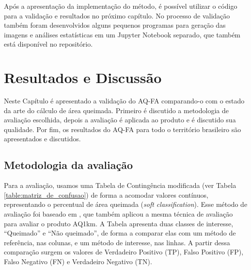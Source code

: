 \documentclass[cic,tc]{iiufrgs}
\begin{document}
\bigskip

Após a apresentação da implementação do método, é possível utilizar o código para a validação e resultados no próximo capítulo. No processo de validação também foram desenvolvidos alguns pequenos programas para geração das imagens e análises estatísticas em um Jupyter Notebook separado, que também está disponível no repositório. 



\chapter{Resultados e Discussão}
\label{chp:resultados_discussão}

Neste Capítulo é apresentado a validação do AQ-FA comparando-o com o estado da arte do cálculo de área queimada. Primeiro é discutido a metodologia de avaliação escolhida, depois a avaliação é aplicada ao produto e é discutido sua qualidade. Por fim, os resultados do AQ-FA para todo o território brasileiro são apresentados e discutidos.

\section{Metodologia da avaliação}
\label{sec:metodologia_avaliacao}

Para a avaliação, usamos uma Tabela de Contingência modificada (ver Tabela \ref{table:matriz_de_confusao}) de forma a acomodar valores contínuos, representando o percentual de área queimada (\textit{soft classification}). Esse método de avaliação foi baseado em \citet{libonati2015algorithm}, que também aplicou a mesma técnica de avaliação para avaliar o produto AQ1km. A Tabela apresenta duas classes de interesse, ``Queimado'' e ``Não queimado'', de forma a comparar elas com um método de referência, nas colunas, e um método de interesse, nas linhas. A partir dessa comparação surgem os valores de Verdadeiro Positivo (TP), Falso Positivo (FP), Falso Negativo (FN) e Verdadeiro Negativo (TN).
\end{document}
